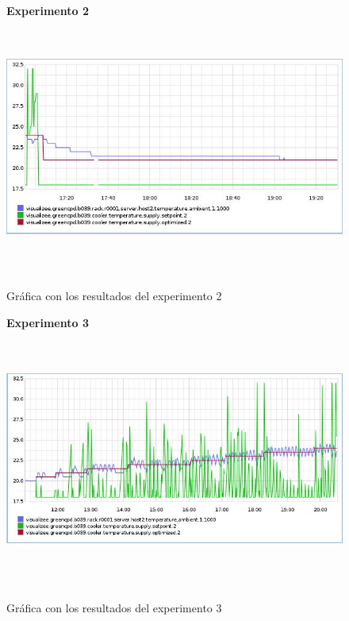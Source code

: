 \begin{figure}[htbp]
\centering
\textbf{Experimento 2}\\
\includegraphics[width=120mm,height=85mm]{imagenes/capitulo6/experimento2}
\caption {Gráfica con los resultados del experimento 2}
\label{fig6_2:experimento2}
\end{figure}

\begin{figure}[htbp]
\centering
\textbf{Experimento 3}\\
\includegraphics[width=120mm,height=85mm]{imagenes/capitulo6/experimento3}
\caption {Gráfica con los resultados del experimento 3}
\label{fig6_3:experimento3}
\end{figure}

\newpage

